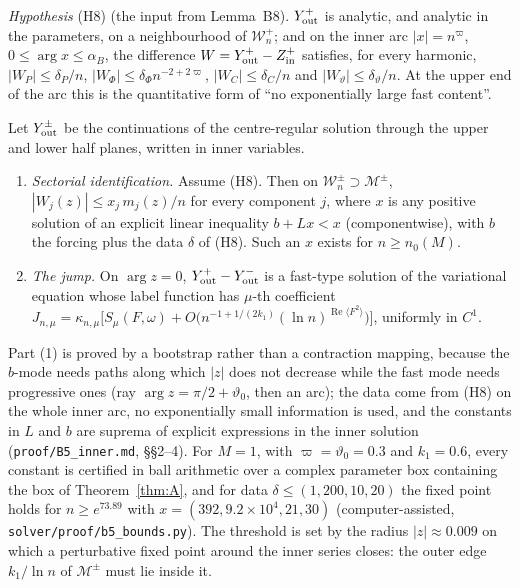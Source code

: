\documentclass{amsart}
\numberwithin{equation}{section}
\theoremstyle{plain}
\newenvironment{lemnamed}[1]{\renewcommand\theinnerlem{#1}\innerlem}{\endinnerlem}
\theoremstyle{definition}
\theoremstyle{remark}
\newcommand{\re}{\operatorname{Re}}
\newcommand{\repo}[1]{\texttt{#1}}
\begin{document}
\smallskip
\emph{Hypothesis} (H8) (the input from Lemma~B8). $Y^+_{\rm out}$ is analytic, and analytic in the parameters, on a
neighbourhood of $\mathcal W^+_n$; and on the inner arc $|x| = n^\varpi$, $0 \le \arg x \le \alpha_B$, the difference
$W = Y^+_{\rm out} - Z^+_{\rm in}$ satisfies, for every harmonic, $|W_P| \le \delta_P/n$, $|W_\Phi| \le \delta_\Phi n^{-2+2\varpi}$,
$|W_C| \le \delta_C/n$ and $|W_\vartheta| \le \delta_\vartheta/n$. At the upper end of the arc this is the quantitative form of
``no exponentially large fast content''.

\begin{lemnamed}{B5($M$)}\label{lem:B5}
Let $Y^\pm_{\rm out}$ be the continuations of the centre-regular solution through the upper and lower half planes, written in
inner variables.
\begin{enumerate}[label=(\arabic*),leftmargin=2em]
\item \emph{Sectorial identification.} Assume (H8). Then on $\mathcal W^\pm_n \supset \mathcal M^\pm$,
$|W_j(z)| \le x_j\,m_j(z)/n$ for every component $j$, where $x$ is any positive solution of an explicit linear inequality
$b + Lx < x$ (componentwise), with $b$ the forcing plus the data $\delta$ of (H8). Such an $x$ exists for $n \ge n_0(M)$.
\item \emph{The jump.} On $\arg z = 0$, $Y^+_{\rm out} - Y^-_{\rm out}$ is a fast-type solution of the variational equation whose
label function has $\mu$-th coefficient
$J_{n,\mu} = \kappa_{n,\mu}\big[S_\mu(F,\omega) + O\big(n^{-1+1/(2k_1)}(\ln n)^{\re\langle F^2\rangle}\big)\big]$, uniformly in $C^1$.
\end{enumerate}
\end{lemnamed}

Part (1) is proved by a bootstrap rather than a contraction mapping, because the $b$-mode needs paths along which $|z|$
does not decrease while the fast mode needs progressive ones (ray $\arg z = \pi/2 + \vartheta_0$, then an arc); the data come
from (H8) on the whole inner arc, no exponentially small information is used, and the constants in $L$ and $b$ are suprema
of explicit expressions in the inner solution (\repo{proof/B5\_inner.md}, \S\S2--4). For $M = 1$, with
$\varpi = \vartheta_0 = 0.3$ and $k_1 = 0.6$, every constant is certified in ball arithmetic over a complex parameter box
containing the box of Theorem~\ref{thm:A}, and for data $\delta \le (1, 200, 10, 20)$ the fixed point holds for $n \ge e^{73.89}$ with
$x = (392, 9.2\times10^4, 21, 30)$ (computer-assisted, \repo{solver/proof/b5\_bounds.py}). The threshold is set by the
radius $|z| \approx 0.009$ on which a perturbative fixed point around the inner series closes: the outer edge $k_1/\ln n$
of $\mathcal M^\pm$ must lie inside it.
\end{document}
